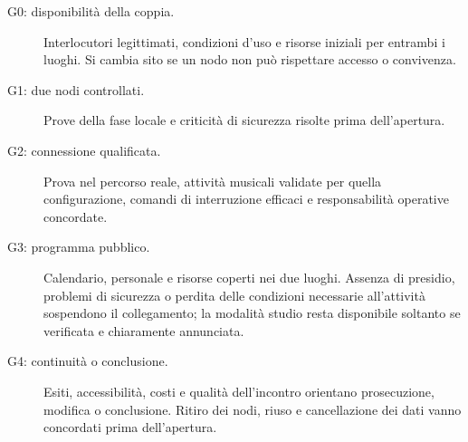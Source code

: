 \begin{description}
\item[G0: disponibilità della coppia.]
Interlocutori legittimati, condizioni d'uso e risorse iniziali per entrambi
i luoghi. Si cambia sito se un nodo non può rispettare accesso o convivenza.
\item[G1: due nodi controllati.]
Prove della fase locale e criticità di sicurezza risolte prima dell'apertura.
\item[G2: connessione qualificata.]
Prova nel percorso reale, attività musicali validate per quella configurazione,
comandi di interruzione efficaci e responsabilità operative concordate.
\item[G3: programma pubblico.]
Calendario, personale e risorse coperti nei due luoghi. Assenza di presidio,
problemi di sicurezza o perdita delle condizioni necessarie all'attività
sospendono il collegamento; la modalità studio resta disponibile soltanto
se verificata e chiaramente annunciata.
\item[G4: continuità o conclusione.]
Esiti, accessibilità, costi e qualità dell'incontro orientano prosecuzione,
modifica o conclusione. Ritiro dei nodi, riuso e cancellazione dei dati
vanno concordati prima dell'apertura.
\end{description}

